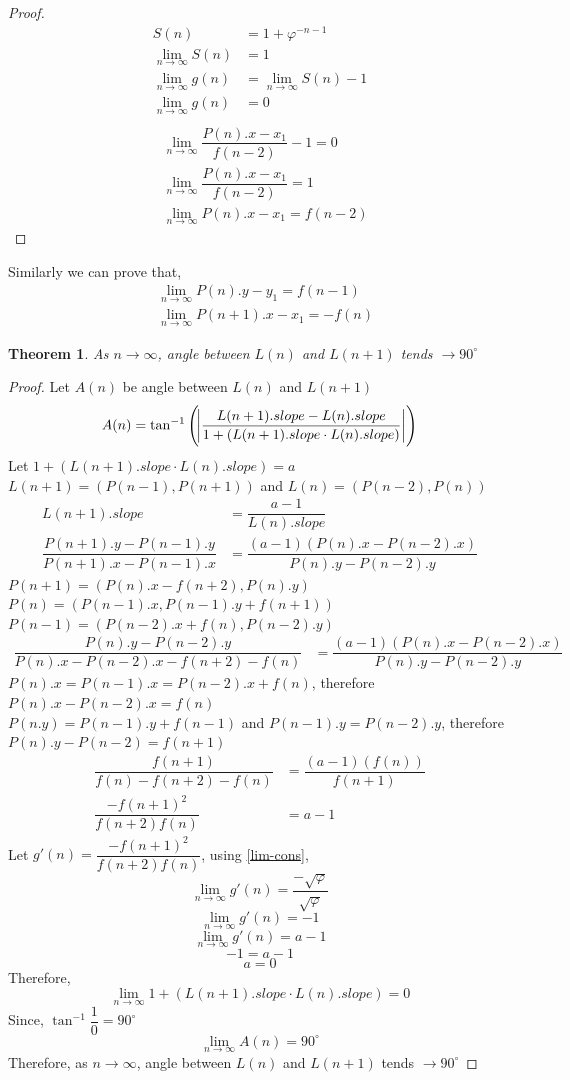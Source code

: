 \documentclass[preprint,12pt]{elsarticle}
\newtheorem{theorem}{Theorem}[section]
\begin{document}
\begin{proof}
\begin{align*}
		S(n) &= 1 + \varphi^{-n-1}\\
		\lim_{n \to \infty} S(n) &= 1\\
		\lim_{n \to \infty} g(n) &= \lim_{n \to \infty} S(n) - 1\\
		\lim_{n \to \infty} g(n) &= 0\\
		\end{align*}
		\begin{align*}
		&\lim_{n \to \infty} \dfrac{P(n).x - x_1}{f(n - 2)} - 1 = 0\\
		&\lim_{n \to \infty} \dfrac{P(n).x - x_1}{f(n - 2)} = 1\\
		&\lim_{n \to \infty} P(n).x -x_1 = f(n-2)
		\end{align*}
	\end{proof}
	Similarly we can prove that,
	\begin{align*}
	&\lim_{n \to \infty} P(n).y -y_1 = f(n-1)\\
	&\lim_{n \to \infty} P(n+1).x -x_1 = -f(n)
	\end{align*}
	\begin{theorem}
		\label{lim-angle}
		As $n \to \infty$, angle between $L(n)$ and $L(n+1)$ tends $\to 90^\circ$
	\end{theorem}
	\begin{proof}
		Let $A(n)$ be angle between $L(n)$ and $L(n+1)$
		$$A(n) = \tan^{-1}\left({\abs{\dfrac{L(n+1).slope-L(n).slope}{1+(L(n+1).slope \cdot L(n).slope)}}}\right)$$
		Let $1 + (L(n+1).slope \cdot L(n).slope) = a$\\
		$L(n+1) = (P(n-1), P(n+1))$ and $L(n) = (P(n-2), P(n))$
		\begin{align*}
		L(n+1).slope &= \dfrac{a - 1}{L(n).slope}\\
		\dfrac{P(n+1).y - P(n-1).y}{P(n+1).x - P(n-1).x} &= \dfrac{(a-1)(P(n).x-P(n-2).x)}{P(n).y-P(n-2).y}
		\end{align*}
		$P(n+1) = (P(n).x - f(n+2), P(n).y)$\\
		$P(n) = (P(n-1).x, P(n-1).y+f(n+1))$\\
		$P(n-1) = (P(n-2).x+f(n), P(n-2).y)$
		\begin{align*}
		\dfrac{P(n).y-P(n-2).y}{P(n).x-P(n-2).x-f(n+2)-f(n)} &= \dfrac{(a-1)(P(n).x-P(n-2).x)}{P(n).y-P(n-2).y}
		\end{align*}
		$P(n).x = P(n-1).x = P(n-2).x+f(n)$, therefore $P(n).x-P(n-2).x=f(n)$\\
		$P(n.y) = P(n-1).y+f(n-1)$ and $P(n-1).y = P(n-2).y$, therefore $P(n).y-P(n-2)=f(n+1)$
		\begin{align*}
		\dfrac{f(n+1)}{f(n)-f(n+2)-f(n)} &= \dfrac{(a-1)(f(n))}{f(n+1)}\\
		\dfrac{-f(n+1)^2}{f(n+2)f(n)} &= a - 1
		\end{align*}
		Let $g'(n) = \dfrac{-f(n+1)^2}{f(n+2)f(n)}$, using \ref{lim-cons},
		$$\lim_{n \to \infty}g'(n) = \dfrac{-\sqrt{\varphi}}{\sqrt{\varphi}}$$
		$$\lim_{n \to \infty}g'(n) = -1$$
		$$\lim_{n \to \infty}g'(n) = a - 1$$
		$$-1 = a - 1$$
		$$a = 0$$
		Therefore, $$\lim_{n \to \infty}1 + (L(n+1).slope \cdot L(n).slope) = 0$$
		Since, $\tan^{-1}{\dfrac{1}{0}} = 90^\circ$
		$$\lim_{n \to \infty} A(n) = 90^\circ$$
		Therefore, as $n \to \infty$, angle between $L(n)$ and $L(n+1)$ tends $\to 90^\circ$
	\end{proof}
\end{document}
